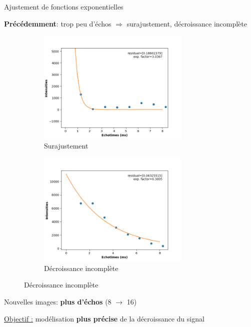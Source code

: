 \documentclass[10pt]{beamer}
\begin{document}
\begin{frame}{Ajustement de fonctions exponentielles}
  
  \textbf{Précédemment}: trop peu d'échos $\Rightarrow$ surajustement, décroissance incomplète

  \begin{figure}[ht]
    \centering
    \begin{subfigure}[t]{0.5\textwidth}
      \centering
      \includegraphics[width=0.8\textwidth]{fig/wrongfit_overfitting}
      \caption{Surajustement}
      \label{subfig:wrongfit_overfitting}
    \end{subfigure}%
    \begin{subfigure}[t]{0.5\textwidth}
      \centering
      \includegraphics[width=0.8\textwidth]{fig/wrongfit_missing}
      \caption{Décroissance incomplète}
      \label{subfig:wrongfit_missing}
    \end{subfigure}%

  \end{figure}


  Nouvelles images: \textbf{plus d'échos} (8 $\rightarrow$ 16)

  \underline{Objectif :} modélisation \textbf{plus précise} de la décroissance du signal  
\end{frame}
\end{document}

